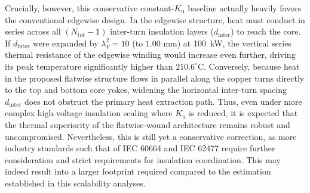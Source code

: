Crucially, however, this conservative constant-$K_{\mathrm{u}}$ baseline actually heavily favors the conventional edgewise design. In the edgewise structure, heat must conduct in series across all $(N_{\mathrm{tot}} - 1)$ inter-turn insulation layers ($d_{\mathrm{inter}}$) to reach the core. If $d_{\mathrm{inter}}$ were expanded by $\lambda_V^2 = 10$ (to $1.00\text{ mm}$) at 100~kW, the vertical series thermal resistance of the edgewise winding would increase even further, driving its peak temperature significantly higher than $210.6^\circ\text{C}$. Conversely, because heat in the proposed flatwise structure flows in parallel along the copper turns directly to the top and bottom core yokes, widening the horizontal inter-turn spacing $d_{\mathrm{inter}}$ does not obstruct the primary heat extraction path. Thus, even under more complex high-voltage insulation scaling where $K_{\mathrm{u}}$ is reduced, it is expected that the thermal superiority of the flatwise-wound architecture remains robust and uncompromised. Nevertheless, this is still yet a conservative correction, as more industry standards such that of  IEC 60664 and IEC 62477 require further consideration and strict requirements for insulation coordination. This may indeed result into a larger footprint required compared to the estimation established in this scalability analyses.